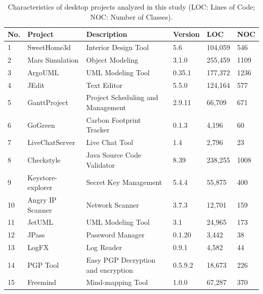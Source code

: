 \documentclass[AMA,Times1COL]{WileyNJDv5} %
\begin{document}
\begin{table}[h]
	\centering %
	\caption{Characteristics of desktop projects analyzed in this study (LOC: Lines of Code; NOC: Number of Classes). } %
	\begin{tabular*}{\textwidth}{@{\extracolsep\fill}llllll@{\extracolsep\fill}}%
		\toprule
		\textbf{No.} & \textbf{Project} & \textbf{Description}  & \textbf{Version} & \textbf{LOC} & \textbf{NOC} \\ 
		\midrule
		1 & SweetHome3d & Interior Design Tool & 5.6 & 104,059 & 546 \\ 
		2 & Mars Simulation & Object Modeling & 3.1.0  & 255,459 & 1109 \\ 
		3 & ArgoUML & UML Modeling Tool & 0.35.1 & 177,372 & 1236 \\ 
		4 & JEdit & Text Editor & 5.5.0 & 124,164 & 577 \\ 
		5 & GanttProject & Project Scheduling  and Management & 2.9.11 & 66,709 & 671 \\ 
		6 & GoGreen & Carbon Footprint Tracker & 0.1.3 & 4,196 & 60 \\  
		7 & LiveChatServer & Live Chat Tool & 1.4 & 2,796 & 23 \\ 
		8 & Checkstyle &  Java Source Code Validator  & 8.39 & 238,255 & 1008 \\ 
		9 & Keystore-explorer & Secret Key Management & 5.4.4 & 55,875 & 400 \\ 
		10 & Angry IP Scanner & Network Scanner & 3.7.3 & 12,701 & 159 \\
		11 & JetUML & UML Modeling Tool & 3.1 & 24,965 & 173 \\ 
		12 & JPass & Password Manager &  0.1.20 & 3,442 & 38 \\ 
		13 & LogFX & Log Reader & 0.9.1 & 4,582 & 44 \\ 
		14 & PGP Tool & Easy PGP Decryption  and encryption  & 0.5.9.2 & 18,673 & 226 \\ 
		15 & Freemind & Mind-mapping Tool & 1.0.0 & 67,287 & 370 \\  
		\bottomrule
	\end{tabular*}
	\label{table:selected_projects-desktop} %
\end{table}
\end{document}
